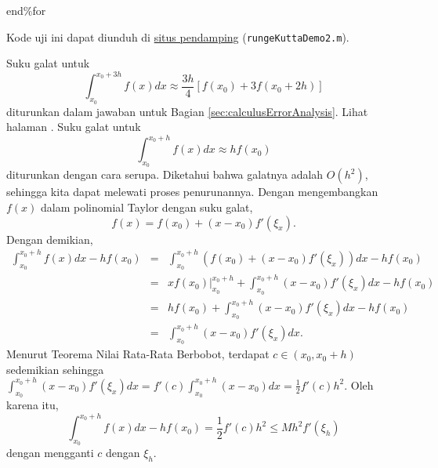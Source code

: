 \begin{description}
\begin{lyxcode}
end\%for
\end{lyxcode}
Kode uji ini dapat diunduh di \href{http://lqbrin.github.io/tea-time-numerical/ancillaries.html}{situs pendamping}
(\texttt{rungeKuttaDemo2.m}). 
\item [{Suku\ galat:}] \label{ans:errorTerms}Suku galat untuk
\[
\int_{x_{0}}^{x_{0}+3h}f(x)dx\approx\frac{3h}{4}\left[f(x_{0})+3f(x_{0}+2h)\right]
\]
diturunkan dalam jawaban untuk Bagian \ref{sec:calculusErrorAnalysis}.
Lihat halaman \pageref{sol:exc:calculusErrors-11}. Suku galat untuk
\[
\int_{x_{0}}^{x_{0}+h}f(x)dx\approx hf(x_{0})
\]
diturunkan dengan cara serupa. Diketahui bahwa galatnya adalah $O(h^{2})$,
sehingga kita dapat melewati proses penurunannya. Dengan mengembangkan
$f(x)$ dalam polinomial Taylor dengan suku galat,
\[
f(x)=f(x_{0})+(x-x_{0})f'(\xi_{x}).
\]
Dengan demikian,
\begin{eqnarray*}
\int_{x_{0}}^{x_{0}+h}f(x)dx-hf(x_{0}) & = & \int_{x_{0}}^{x_{0}+h}\left(f(x_{0})+(x-x_{0})f'(\xi_{x})\right)dx-hf(x_{0})\\
 & = & \left.xf(x_{0})\right|_{x_{0}}^{x_{0}+h}+\int_{x_{0}}^{x_{0}+h}(x-x_{0})f'(\xi_{x})dx-hf(x_{0})\\
 & = & hf(x_{0})+\int_{x_{0}}^{x_{0}+h}(x-x_{0})f'(\xi_{x})dx-hf(x_{0})\\
 & = & \int_{x_{0}}^{x_{0}+h}(x-x_{0})f'(\xi_{x})dx.
\end{eqnarray*}
Menurut Teorema Nilai Rata-Rata Berbobot, terdapat $c\in(x_{0},x_{0}+h)$
sedemikian sehingga $\int_{x_{0}}^{x_{0}+h}(x-x_{0})f'(\xi_{x})dx=f'(c)\int_{x_{0}}^{x_{0}+h}(x-x_{0})dx=\frac{1}{2}f'(c)h^{2}$.
Oleh karena itu, 
\[
\int_{x_{0}}^{x_{0}+h}f(x)dx-hf(x_{0})=\frac{1}{2}f'(c)h^{2}\leq Mh^{2}f'(\xi_{h})
\]
dengan mengganti $c$ dengan $\xi_{h}$. 
\end{description}

